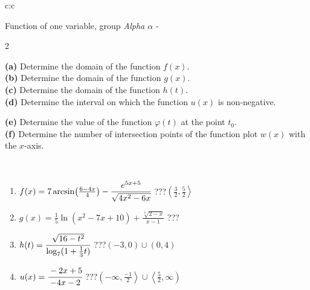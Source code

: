 \documentclass[10pt]{report}
\begin{document}
\thispagestyle{empty}
\begin{tabular}{c:c}
\begin{minipage}[c][104.5mm][t]{0.5\linewidth}
\begin{center}
\vspace{7mm}
{\huge Function of one variable, group \textit{Alpha $\alpha$} -}\\[5mm]
\begin{minipage}{0.95\linewidth}
\begin{center}
{\small \begin{multicols}{2} \raggedright
\textbf{(a)} Determine the domain of the function \(f(x)\). \\[1mm]
\textbf{(b)} Determine the domain of the function \(g(x)\). \\[1mm]
\textbf{(c)} Determine the domain of the function \(h(t)\). \\[1mm]
\textbf{(d)} Determine the interval on which the function \(u(x)\) is non-negative. \par \columnbreak
\textbf{(e)} Determine the value of the function \(\varphi(t)\) at the point \(t_0\). \\[1mm]
\textbf{(f)} Determine the number of intersection points of the function plot \(w(x)\) with the \(x\)-axis. \\[1mm]
\end{multicols}
}
\end{center}
\end{minipage}
\\[4mm]
\begin{minipage}{0.79\linewidth}
\begin{center}
\begin{varwidth}{\linewidth}
\begin{enumerate}
\small
\item $f(x) = 7\arcsin\!\left( \frac{6-4x}{4} \right) - \cfrac{e^{5x+5}}{\sqrt{4x^2-6x}}$\quad \dotfill\; ???\;\dotfill \quad $\left(\frac{3}{2} , \frac{5}{2}\right\rangle$
\item $g(x) = \frac{1}{5} \ln{\!(x^2-7x+10)}+\frac{\sqrt[3]{2-x}}{x-1}$\quad \dotfill\; ???\;\dotfill {}
\item $h(t) = \cfrac{\sqrt{16-t^2}}{\log_7(1+\frac{1}{3}t)}$\quad \dotfill\; ???\;\dotfill \quad $\left(-3 , 0\right)\cup\left(0 , 4\right)$
\item $u(x) = \cfrac{-2x+5}{-4x-2}$\quad \dotfill\; ???\;\dotfill \quad $\left(-\infty , \frac{-1}{2}\right\rangle\cup\left\langle\frac{5}{2} , \infty\right)$

\end{enumerate}
\end{varwidth}
\end{center}
\end{minipage}
\end{center}
\end{minipage}
\end{tabular}
\end{document}
